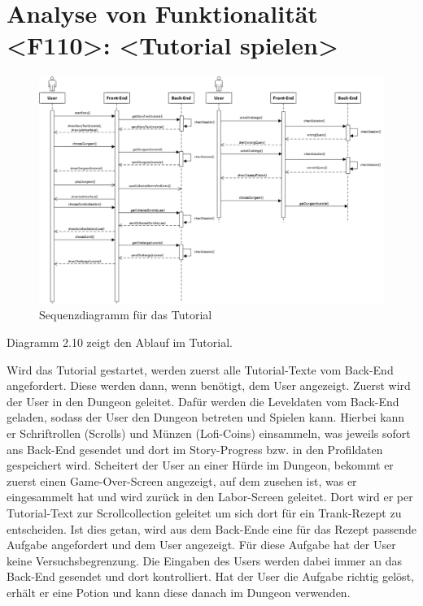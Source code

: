 \section{Analyse von Funktionalität <F110>: <Tutorial spielen>}
\begin{figure}[h]
\centering
\includegraphics[width=1.0\textwidth]{figures/sequenz_F110.pdf}
\caption{Sequenzdiagramm für das Tutorial}
\label{sequence}
\end{figure}
Diagramm 2.10 zeigt den Ablauf im Tutorial.

Wird das Tutorial gestartet, werden zuerst alle Tutorial-Texte vom Back-End angefordert. Diese werden dann, wenn benötigt, dem User angezeigt. Zuerst wird der User in den Dungeon geleitet. Dafür werden die Leveldaten vom Back-End geladen, sodass der User den Dungeon betreten und Spielen kann. Hierbei kann er Schriftrollen (\glqq Scrolls\grqq) und Münzen (\glqq Lofi-Coins\grqq) einsammeln, was jeweils sofort ans Back-End gesendet und dort im Story-Progress bzw. in den Profildaten gespeichert wird.
Scheitert der User an einer Hürde im Dungeon, bekommt er zuerst einen Game-Over-Screen angezeigt, auf dem zusehen ist, was er eingesammelt hat und wird zur\"uck in den Labor-Screen geleitet.
Dort wird er per Tutorial-Text zur Scrollcollection geleitet um sich dort für ein Trank-Rezept zu entscheiden. Ist dies getan, wird aus dem Back-Ende eine für das Rezept passende Aufgabe angefordert und dem User angezeigt. Für diese Aufgabe hat der User keine Versuchsbegrenzung. Die Eingaben des Users werden dabei immer an das Back-End gesendet und dort kontrolliert. Hat der User die Aufgabe richtig gelöst, erhält er eine Potion und kann diese danach im Dungeon verwenden.

